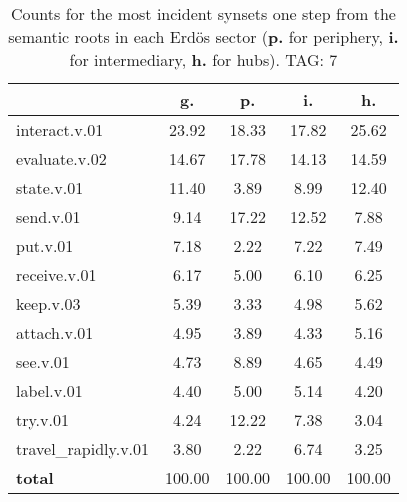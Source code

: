 \begin{table}[h!]
\begin{center}
\begin{tabular}{| l | c | c | c | c |}\hline
 & g. & p. & i. & h. \\\hline
interact.v.01 & 23.92  & 18.33  & 17.82  & 25.62 \\\hline
evaluate.v.02 & 14.67  & 17.78  & 14.13  & 14.59 \\\hline
state.v.01 & 11.40  & 3.89  & 8.99  & 12.40 \\\hline
send.v.01 & 9.14  & 17.22  & 12.52  & 7.88 \\\hline
put.v.01 & 7.18  & 2.22  & 7.22  & 7.49 \\\hline
receive.v.01 & 6.17  & 5.00  & 6.10  & 6.25 \\\hline
keep.v.03 & 5.39  & 3.33  & 4.98  & 5.62 \\\hline
attach.v.01 & 4.95  & 3.89  & 4.33  & 5.16 \\\hline
see.v.01 & 4.73  & 8.89  & 4.65  & 4.49 \\\hline
label.v.01 & 4.40  & 5.00  & 5.14  & 4.20 \\\hline
try.v.01 & 4.24  & 12.22  & 7.38  & 3.04 \\\hline
travel\_rapidly.v.01 & 3.80  & 2.22  & 6.74  & 3.25 \\\hline
{{\bf total}} & 100.00  & 100.00  & 100.00  & 100.00 \\\hline
\end{tabular}
\caption{Counts for the most incident synsets one step from the semantic roots in each Erd\"os sector ({\bf p.} for periphery, {\bf i.} for intermediary, {\bf h.} for hubs). TAG: 7}
\end{center}
\end{table}
